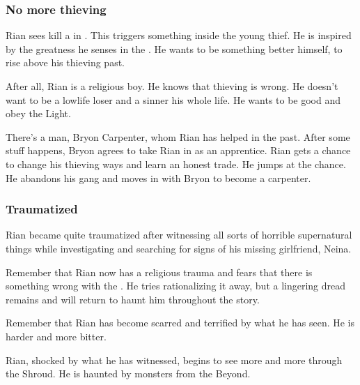 \subsubsection{No more thieving}
Rian sees \QuessanthIshnaruchaefir{} kill a \ghobal{} in \Malcur. 
This triggers something inside the young thief. 
He is inspired by the greatness he senses in the \draconic{} \vertex. 
He wants to be something better himself, to rise above his thieving past. 

After all, Rian is a religious boy. 
He knows that thieving is wrong. 
He doesn't want to be a lowlife loser and a sinner his whole life. 
He wants to be good and obey the Light. 

There's a man, Bryon Carpenter, whom Rian has helped in the past. 
After some stuff happens, Bryon agrees to take Rian in as an apprentice. 
Rian gets a chance to change his thieving ways and learn an honest trade. 
He jumps at the chance. 
He abandons his gang and moves in with Bryon to become a carpenter. 





\subsubsection{Traumatized}
Rian became quite traumatized after witnessing all sorts of horrible supernatural things while investigating \Malcur and searching for signs of his missing girlfriend, Neina. 

Remember that Rian now has a religious trauma and fears that there is something wrong with the \sephiroth. 
He tries rationalizing it away, but a lingering dread remains and will return to haunt him throughout the story. 


Remember that Rian has become scarred and terrified by what he has seen. 
He is harder and more bitter. 

Rian, shocked by what he has witnessed, begins to see more and more through the Shroud. 
He is haunted by monsters from the Beyond. 

